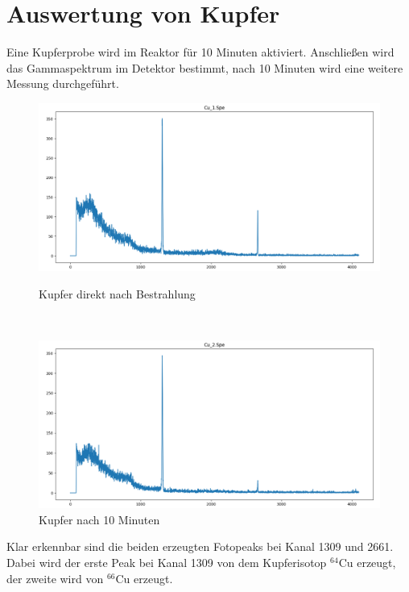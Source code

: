 \documentclass[12pt,german]{article}
\begin{document}
    \section{Auswertung von Kupfer}
    Eine Kupferprobe wird im Reaktor für 10 Minuten aktiviert. Anschließen wird das Gammaspektrum im Detektor bestimmt, nach 10 Minuten wird eine weitere Messung durchgeführt.
    \begin{figure}[H]
        \centering
        \begin{minipage}[t]{0.9\textwidth}
            \centering
            \includegraphics[width=1\textwidth]{pics/Cu_1.png}
            \caption{Kupfer direkt nach Bestrahlung}
        \end{minipage}
        \\[10pt]
        \begin{minipage}[t]{0.9\textwidth}
            \centering
            \includegraphics[width=1\textwidth]{pics/Cu_2.png}
            \caption{Kupfer nach 10 Minuten}
        \end{minipage}
    \end{figure}

    \newpage
    Klar erkennbar sind die beiden erzeugten Fotopeaks bei Kanal 1309 und 2661. Dabei wird der erste Peak bei Kanal 1309 von dem Kupferisotop $^{64}$Cu erzeugt, der zweite wird von $^{66}$Cu erzeugt.
\end{document}
